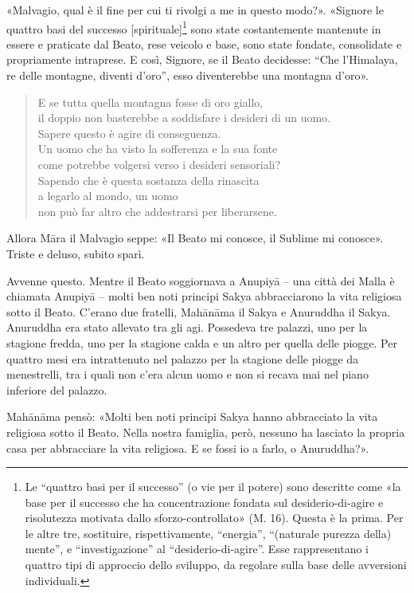 «Malvagio, qual è il fine per cui ti rivolgi a me in questo modo?».
«Signore le quattro basi del successo [spirituale]\footnote{Le “quattro basi per il successo” (o vie per il potere) sono descritte come «la base per il successo che ha concentrazione fondata sul desiderio-di-agire e risolutezza motivata dallo sforzo-controllato» (M. 16). Questa è la prima. Per le altre tre, sostituire, rispettivamente, “energia”, “(naturale purezza della) mente”, e “investigazione” al “desiderio-di-agire”. Esse rappresentano i quattro tipi di approccio dello sviluppo, da regolare sulla base delle avversioni individuali.} sono state costantemente mantenute
in essere e praticate dal Beato, rese
veicolo e base, sono state fondate, consolidate e propriamente
intraprese. E così, Signore, se il Beato decidesse: “Che l’Himalaya, re
delle montagne, diventi d’oro”, esso diventerebbe una montagna d’oro».


\begin{quote}
E se tutta quella montagna fosse di oro giallo, \\
il doppio non basterebbe a soddisfare i desideri di un uomo. \\
Sapere questo è agire di conseguenza. \\
Un uomo che ha visto la sofferenza e la sua fonte \\
come potrebbe volgersi verso i desideri sensoriali? \\
Sapendo che è questa sostanza della rinascita \\
a legarlo al mondo, un uomo \\
non può far altro che addestrarsi per liberarsene.
\end{quote}

Allora Māra il Malvagio seppe: «Il Beato mi conosce, il Sublime mi
conosce». Triste e deluso, subito sparì.




 Avvenne questo. Mentre il Beato soggiornava a Anupiyā –
una città dei Malla è chiamata Anupiyā – molti ben noti principi Sakya
abbracciarono la vita religiosa sotto il Beato. C’erano due fratelli,
Mahānāma il Sakya e Anuruddha il Sakya. Anuruddha era stato allevato tra
gli agi. Possedeva tre palazzi, uno per la stagione fredda, uno per la
stagione calda e un altro per quella delle piogge. Per quattro mesi era
intrattenuto nel palazzo per la stagione delle piogge da menestrelli,
tra i quali non c’era alcun uomo e non si recava mai nel piano inferiore
del palazzo.


Mahānāma pensò: «Molti ben noti principi Sakya hanno abbracciato la vita
religiosa sotto il Beato. Nella nostra famiglia, però, nessuno ha
lasciato la propria casa per abbracciare la vita religiosa. E se fossi
io a farlo, o Anuruddha?».


